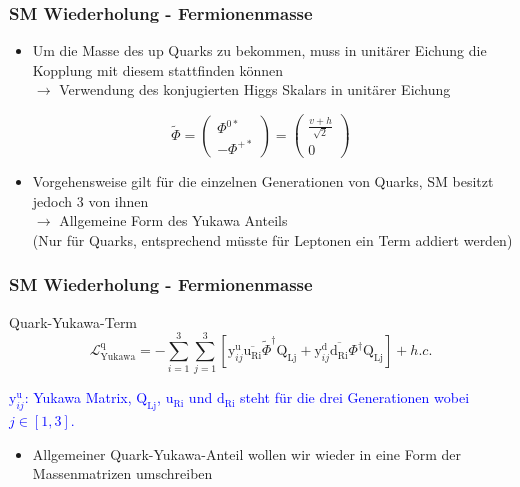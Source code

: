 \documentclass[xcolor=dvipsnames]{beamer}
\begin{document}
\begin{frame}
\frametitle{SM Wiederholung - Fermionenmasse}
\begin{itemize}
\item Um die Masse des up Quarks zu bekommen, muss in unitärer Eichung die Kopplung mit diesem stattfinden können \\ $\rightarrow$ Verwendung des konjugierten Higgs Skalars in unitärer Eichung
\end{itemize}
 \begin{equation*}
 \tilde{\Phi}=\left( \begin{array}{c} \Phi^{0*}\\ -\Phi^{+*} \end{array}\right)=\left( \begin{array}{c}  \frac{v+h}{\sqrt{2}}\\ 0 \end{array}\right)
 \end{equation*}
 \begin{itemize}
\item Vorgehensweise gilt für die einzelnen Generationen von Quarks, SM besitzt jedoch 3 von ihnen \\ $\rightarrow$ Allgemeine Form des Yukawa Anteils \\ (Nur für Quarks, entsprechend müsste für Leptonen ein Term addiert werden)
\end{itemize}

\end{frame}

\begin{frame}[t]
\frametitle{SM Wiederholung - Fermionenmasse}
\begin{block}{Quark-Yukawa-Term}
\begin{equation*}
\mathscr{L}_{\text{Yukawa}}^{\text{q}}=- \sum_{i=1}^{3} \sum_{j=1}^{3} [\text{y}^{\text{u}}_{ij}\overline{\text{u}_{\text{Ri}}} \tilde{\Phi}^{\dagger}\text{Q}_{\text{Lj}}+\text{y}^{\text{d}}_{ij} \overline{\text{d}_{\text{Ri}}}\Phi^{\dagger} \text{Q}_{\text{Lj}}]+h.c.
\end{equation*}
\end{block}
\textcolor{Blue}{$\text{y}^{\text{u}}_{ij}$: Yukawa Matrix, $\text{Q}_{\text{Lj}}$, $\text{u}_{\text{Ri}}$ und $\text{d}_{\text{Ri}}$ steht für die drei Generationen wobei $j \in [1,3]$.}

\begin{itemize}
\item Allgemeiner Quark-Yukawa-Anteil wollen wir wieder in eine Form der Massenmatrizen umschreiben
\end{itemize}
\end{frame}
\end{document}
